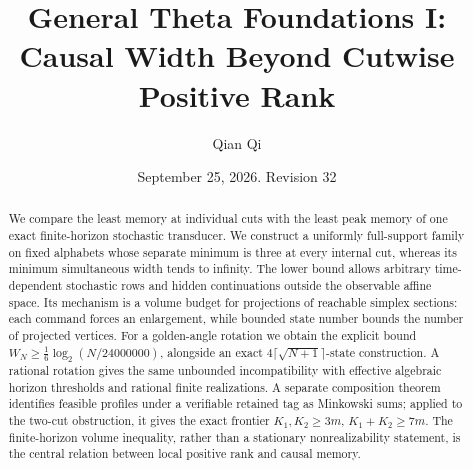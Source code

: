 \documentclass[11pt]{amsart}
\title[Causal width and positive realization]{General Theta Foundations I:\\
Causal Width Beyond Cutwise Positive Rank}
\author{Qian Qi}
\date{September 25, 2026. Revision 32}
\theoremstyle{definition}\newtheorem{definition}[theorem]{Definition}
\theoremstyle{remark}\newtheorem{remark}[theorem]{Remark}
\begin{document}
\begin{abstract}
We compare the least memory at individual cuts with the least peak memory
of one exact finite-horizon stochastic transducer. We construct a
uniformly full-support family on fixed alphabets whose separate minimum
is three at every internal cut, whereas its minimum simultaneous width
tends to infinity. The lower bound allows arbitrary time-dependent
stochastic rows and hidden continuations outside the observable affine
space. Its mechanism is a volume budget for projections of reachable
simplex sections: each command forces an enlargement, while bounded
state number bounds the number of projected vertices. For a golden-angle
rotation we obtain the explicit bound
$W_N\ge\frac16\log_2(N/24000000)$, alongside an exact
$4\lceil\sqrt{N+1}\rceil$-state construction. A rational rotation gives
the same unbounded incompatibility with effective algebraic horizon
thresholds and rational finite realizations. A separate composition
theorem identifies feasible profiles under a verifiable retained tag as
Minkowski sums; applied to the two-cut obstruction, it gives the exact
frontier $K_1,K_2\ge3m$, $K_1+K_2\ge7m$. The finite-horizon volume
inequality, rather than a stationary nonrealizability statement, is the
central relation between local positive rank and causal memory.
\end{abstract}
\maketitle







\appendix


\end{document}
